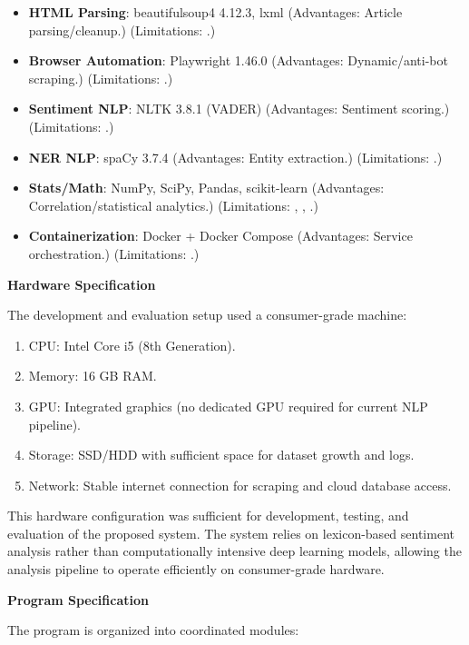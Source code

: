 \begin{itemize}
\item \textbf{HTML Parsing}: beautifulsoup4 4.12.3, lxml (Advantages: Article parsing/cleanup.) (Limitations: \cite{ref39}.)
\item \textbf{Browser Automation}: Playwright 1.46.0 (Advantages: Dynamic/anti-bot scraping.) (Limitations: \cite{ref30}.)
\item \textbf{Sentiment NLP}: NLTK 3.8.1 (VADER) (Advantages: Sentiment scoring.) (Limitations: \cite{ref01,ref08}.)
\item \textbf{NER NLP}: spaCy 3.7.4 (Advantages: Entity extraction.) (Limitations: \cite{ref26}.)
\item \textbf{Stats/Math}: NumPy, SciPy, Pandas, scikit-learn (Advantages: Correlation/statistical analytics.) (Limitations: \cite{ref07,ref13}, \cite{ref20}, \cite{ref36}.)
\item \textbf{Containerization}: Docker + Docker Compose (Advantages: Service orchestration.) (Limitations: \cite{ref35}.)
\end{itemize}
\textbf{Hardware Specification}

The development and evaluation setup used a consumer-grade machine:

\begin{enumerate}
\def\labelenumi{\arabic{enumi}.}
\item
  CPU: Intel Core i5 (8th Generation).
\item
  Memory: 16 GB RAM.
\item
  GPU: Integrated graphics (no dedicated GPU required for current NLP pipeline).
\item
  Storage: SSD/HDD with sufficient space for dataset growth and logs.
\item
  Network: Stable internet connection for scraping and cloud database access.
\end{enumerate}

This hardware configuration was sufficient for development, testing, and evaluation of the proposed system. The system relies on lexicon-based sentiment analysis rather than computationally intensive deep learning models, allowing the analysis pipeline to operate efficiently on consumer-grade hardware.

\textbf{Program Specification}

The program is organized into coordinated modules:

